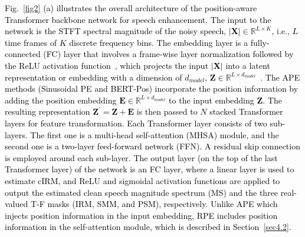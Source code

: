 \documentclass[journal]{IEEEtran}
\begin{document}
\textcolor{black}{\textcolor{black}{Fig.~\ref{fig2} (a) illustrates the overall architecture of the position-aware Transformer backbone network for speech enhancement.} The input to the network is the STFT spectral magnitude of the noisy speech, $|\textbf{X}|\!\in\!\mathbb{R}^{L\times K}$, i.e., $L$ time frames of $K$ discrete frequency bins. The embedding layer is a fully-connected (FC) layer that involves a frame-wise layer normalization followed by the ReLU activation function~\cite{tfaj}, which projects the input $|\textbf{X}|$ into a latent representation or embedding with a dimension of $d_{model}$, $\textbf{Z}\!\in\!\mathbb{R}^{L\times d_{model}}$~\cite{tfa}. \textcolor{black}{The APE methods (Sinusoidal PE and BERT-Pos) incorporate the position information by adding the position embedding $\textbf{E}\!\in\!\mathbb{R}^{L\times d_{model}}$ to the input embedding $\textbf{Z}$. The resulting representation $\textbf{Z}^{\prime}\!=\!\textbf{Z}\!+\!\textbf{E}$ is then passed to $N$ stacked Transformer layers for feature transformation. Each Transformer layer consists of two sub-layers. The first one is a multi-head self-attention (MHSA) module, and the second one is a two-layer feed-forward network (FFN). A residual skip connection is employed around each sub-layer. The output layer (on the top of the last Transformer layer) of the network is an FC layer, where a linear layer is used to estimate cIRM, and ReLU and sigmoidal activation functions are applied to output the estimated clean speech magnitude spectrum (MS) and the three real-valued T-F masks (IRM, SMM, and PSM), respectively. Unlike APE which injects position information in the input embedding, RPE includes position information in the self-attention module, which is described in Section~\ref{sec4.2}.
}}


\end{document}
